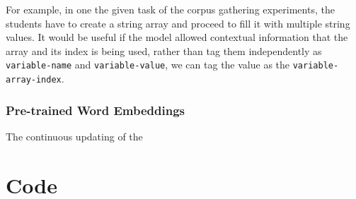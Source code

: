 \documentclass[fyp]{socreport}
\begin{document}
For example, in one the given task of the corpus gathering experiments, the
students have to create a string array and proceed to fill it with multiple
string values. It would be useful if the model allowed contextual information
that the array and its index is being used, rather than tag them independently
as \texttt{variable-name} and \texttt{variable-value}, we can tag the value as
the \texttt{variable-array-index}.


\subsection{Pre-trained Word Embeddings}
The continuous updating of the

\printbibliography[title={Whole bibliography}]

\appendix
\chapter{Code}
\end{document}
